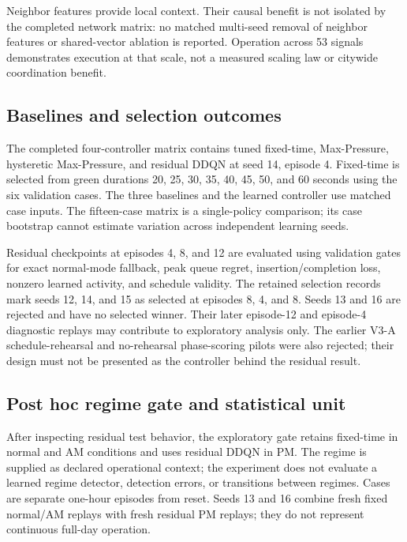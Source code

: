 \documentclass[12pt,a4paper]{report}
\begin{document}
Neighbor features provide local context. Their causal benefit is not isolated by the completed network matrix: no matched multi-seed removal of neighbor features or shared-vector ablation is reported. Operation across 53 signals demonstrates execution at that scale, not a measured scaling law or citywide coordination benefit.

\subsection{Baselines and selection outcomes}
The completed four-controller matrix contains tuned fixed-time, Max-Pressure, hysteretic Max-Pressure, and residual DDQN at seed 14, episode 4. Fixed-time is selected from green durations 20, 25, 30, 35, 40, 45, 50, and 60 seconds using the six validation cases. The three baselines and the learned controller use matched case inputs. The fifteen-case matrix is a single-policy comparison; its case bootstrap cannot estimate variation across independent learning seeds.

Residual checkpoints at episodes 4, 8, and 12 are evaluated using validation gates for exact normal-mode fallback, peak queue regret, insertion/completion loss, nonzero learned activity, and schedule validity. The retained selection records mark seeds 12, 14, and 15 as selected at episodes 8, 4, and 8. Seeds 13 and 16 are rejected and have no selected winner. Their later episode-12 and episode-4 diagnostic replays may contribute to exploratory analysis only. The earlier V3-A schedule-rehearsal and no-rehearsal phase-scoring pilots were also rejected; their design must not be presented as the controller behind the residual result.

\subsection{Post hoc regime gate and statistical unit}
After inspecting residual test behavior, the exploratory gate retains fixed-time in normal and AM conditions and uses residual DDQN in PM. The regime is supplied as declared operational context; the experiment does not evaluate a learned regime detector, detection errors, or transitions between regimes. Cases are separate one-hour episodes from reset. Seeds 13 and 16 combine fresh fixed normal/AM replays with fresh residual PM replays; they do not represent continuous full-day operation.
\end{document}
